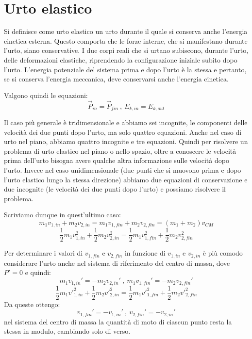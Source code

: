 \documentclass[class=book, crop=false, oneside, 12pt]{standalone}
\begin{document}
\section{Urto elastico}

Si definisce come urto elastico un urto durante il quale si conserva anche l'energia cinetica esterna.
Questo comporta che le forze interne, che si manifestano durante l'urto, siano conservative. 
I due corpi reali che si urtano subiscono, durante l'urto, delle deformazioni elastiche, riprendendo la configurazione iniziale subito dopo l'urto.
L'energia potenziale del sistema prima e dopo l'urto è la stessa e pertanto, se si conserva l'energia meccanica, deve conservarsi anche l'energia cinetica.

Valgono quindi le equazioni:
\begin{equation*}
    \overrightarrow{P}_{in} = \overrightarrow{P}_{fin} \ , \ E_{k,in} = E_{k,out}
\end{equation*}

Il caso più generale è tridimensionale e abbiamo sei incognite, le componenti delle velocità dei due punti dopo l'urto, ma solo quattro equazioni.
Anche nel caso di urto nel piano, abbiamo quattro incognite e tre equazioni. 
Quindi per risolvere un problema di urto elastico nel piano o nello spazio, oltre a conoscere le velocità prima dell'urto bisogna avere qualche altra informazione sulle velocità dopo l'urto.
Invece nel caso unidimensionale (due punti che si muovono prima e dopo l'urto elastico lungo la stessa direzione) abbiamo due equazioni di conservazione e due incognite (le velocità dei due punti dopo l'urto) e possiamo risolvere il problema.

Scriviamo dunque in quest'ultimo caso:
\begin{equation*}
    m_1 v_{1,in} + m_2 v_{2,in} = m_1 v_{1,fin} + m_2 v_{2,fin} = \left( m_1 + m_2 \right) v_{CM}
\end{equation*}
\begin{equation*}
    \frac{1}{2} m_1 v_{1,in}^2 + \frac{1}{2} m_2 v_{2,in}^2 = \frac{1}{2} m_1 v_{1,fin}^2 + \frac{1}{2} m_2 v_{2,fin}^2
\end{equation*}

Per determinare i valori di \(v_{1,fin}\) e \(v_{2,fin}\) in funzione di \(v_{1,in}\) e \(v_{2,in}\) è più comodo considerare l'urto anche nel sistema di riferimento del centro di massa, dove \(P' =0\) e quindi: 
\begin{equation*}
    m_1 v_{1,in}' = -m_2 v_{2,in}' \ , \  m_1 v_{1,fin}' = -m_2 v_{2,fin}'
\end{equation*}
\begin{equation*}
    \frac{1}{2} m_1 {v'}_{1,in}^2 + \frac{1}{2} m_2 {v'}_{2,in}^2 = \frac{1}{2} m_1 {v'}_{1,fin}^2 + \frac{1}{2} m_2 {v'}_{2,fin}^2
\end{equation*}
Da queste ottengo:
\begin{equation*}
    v_{1,fin}' = - v_{1,in}' \ , \ v_{2,fin}' = - v_{2,in}'
\end{equation*}
nel sistema del centro di massa la quantità di moto di ciascun punto resta la stessa in modulo, cambiando solo di verso. 
\end{document}
